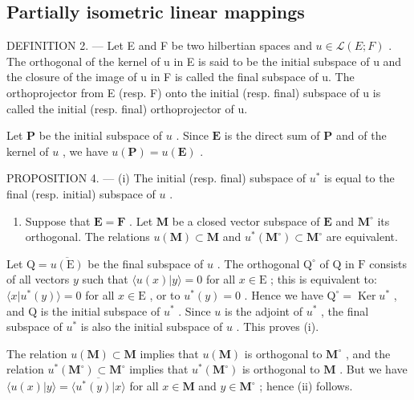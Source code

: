\subsection{Partially isometric linear mappings}

DEFINITION 2. --- Let E and F be two hilbertian spaces and \(u \in \mathcal{L}(E; F)\) . The orthogonal of the kernel of u in E is said to be the initial subspace of u and the closure of the image of u in F is called the final subspace of u. The orthoprojector from E (resp. F) onto the initial (resp. final) subspace of u is called the initial (resp. final) orthoprojector of u.

Let \(\mathbf{P}\) be the initial subspace of \(u\) . Since \(\mathbf{E}\) is the direct sum of \(\mathbf{P}\) and of the kernel of \(u\) , we have \(u(\mathbf{P}) = u(\mathbf{E})\) .

PROPOSITION 4. --- (i) The initial (resp. final) subspace of \(u^*\) is equal to the final (resp. initial) subspace of \(u\) .

\begin{enumerate}
\def\labelenumi{(\roman{enumi})}
\setcounter{enumi}{1}
\tightlist
\item
  Suppose that \(\mathbf{E} = \mathbf{F}\) . Let \(\mathbf{M}\) be a closed vector subspace of \(\mathbf{E}\) and \(\mathbf{M}^{\circ}\) its orthogonal. The relations \(u(\mathbf{M}) \subset \mathbf{M}\) and \(u^{*}(\mathbf{M}^{\circ}) \subset \mathbf{M}^{\circ}\) are equivalent.
\end{enumerate}

Let \(\mathrm{Q} = \overline{u(\mathrm{E})}\) be the final subspace of \(u\) . The orthogonal \(\mathrm{Q}^{\circ}\) of \(\mathrm{Q}\) in \(\mathrm{F}\) consists of all vectors \(y\) such that \(\langle u(x)|y\rangle = 0\) for all \(x\in \mathrm{E}\) ; this is equivalent to: \(\langle x|u^{*}(y)\rangle = 0\) for all \(x\in \mathrm{E}\) , or to \(u^{*}(y) = 0\) . Hence we have \(\mathrm{Q}^{\circ} = \operatorname{Ker}u^{*}\) , and \(\mathrm{Q}\) is the initial subspace of \(u^{*}\) . Since \(u\) is the adjoint of \(u^{*}\) , the final subspace of \(u^{*}\) is also the initial subspace of \(u\) . This proves (i).

The relation \(u(\mathbf{M}) \subset \mathbf{M}\) implies that \(u(\mathbf{M})\) is orthogonal to \(\mathbf{M}^{\circ}\) , and the relation \(u^{*}(\mathbf{M}^{\circ}) \subset \mathbf{M}^{\circ}\) implies that \(u^{*}(\mathbf{M}^{\circ})\) is orthogonal to \(\mathbf{M}\) . But we have \(\langle u(x)|y\rangle = \overline{\langle u^{*}(y)|x\rangle}\) for all \(x \in \mathbf{M}\) and \(y \in \mathbf{M}^{\circ}\) ; hence (ii) follows.

